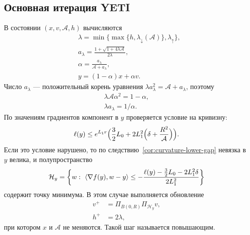 \subsection{Основная итерация YETI}
В состоянии $(x,v,\mathcal A,h)$ вычисляются
\begin{equation}\label{eq:outer-step-setup}
 \begin{aligned}
 &\lambda=\min\bigl\{\max\{h,\lambda_\downarrow(\mathcal A)\},\lambda_{\uparrow}\bigr\},\\
 &a_\lambda=\frac{1+\sqrt{1+4\lambda\mathcal A}}{2\lambda},\\
 &\alpha=\frac{a_\lambda}{\mathcal A+a_\lambda},\\
 &y=(1-\alpha)x+\alpha v.
 \end{aligned}
\end{equation}
Число $a_\lambda$ --- положительный корень уравнения
$\lambda a_\lambda^2=\mathcal A+a_\lambda$, поэтому
\[
 \begin{gathered}
 \lambda\mathcal A\alpha^2=1-\alpha,\\
 \lambda a_\lambda=1/\alpha.
 \end{gathered}
\]
По значениям градиентов компонент в $y$ проверяется условие на кривизну:
\begin{equation}\label{eq:simple-curvature-test}
 \ell(y)\le e^{L_1r}\Bigl(\frac32L_0+2L_1^2\Bigl(\delta+\frac{R^2}{\mathcal A}\Bigr)\Bigr).
\end{equation}
Если это условие нарушено, то по следствию~\ref{cor:curvature-lower-gap}
невязка в $y$ велика, и полупространство
\begin{equation}\label{eq:cut-update}
 \mathcal H_y=\left\{w:\ \langle \nabla f(y),w-y\rangle
 \le-\frac{\ell(y)-\frac32L_0-2L_1^2\delta}{2L_1^2}\right\}
\end{equation}
содержит точку минимума. В этом случае выполняется обновление
\[
 \begin{aligned}
 v^+&=\Pi_{B(0,R)}\Pi_{\mathcal H_y}v,\\
 h^+&=2\lambda,
 \end{aligned}
\]
при котором $x$ и $\mathcal A$ не меняются. Такой шаг называется
повышающим.

